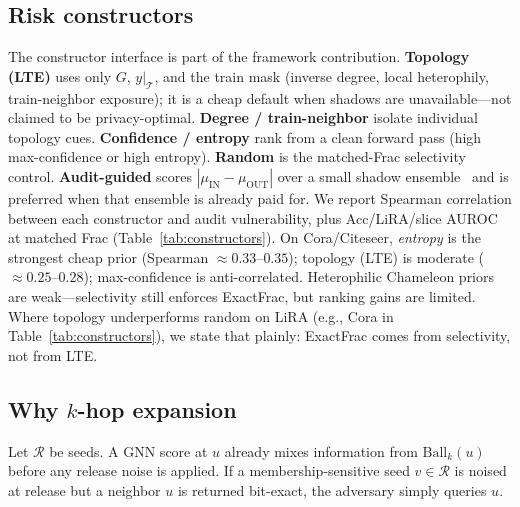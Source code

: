 \documentclass[conference]{IEEEtran}
\begin{document}
\subsection{Risk constructors}
\label{sec:lte}
The constructor interface is part of the framework contribution.
\textbf{Topology (LTE)} uses only $G$, $y|_{\mathcal{T}}$, and the train mask (inverse degree, local heterophily, train-neighbor exposure); it is a cheap default when shadows are unavailable---not claimed to be privacy-optimal.
\textbf{Degree / train-neighbor} isolate individual topology cues.
\textbf{Confidence / entropy} rank from a clean forward pass (high max-confidence or high entropy).
\textbf{Random} is the matched-Frac selectivity control.
\textbf{Audit-guided} scores $|\mu_{\mathrm{IN}}-\mu_{\mathrm{OUT}}|$ over a small shadow ensemble~\cite{aerni2024misleading} and is preferred when that ensemble is already paid for.
We report Spearman correlation between each constructor and audit vulnerability, plus Acc/LiRA/slice AUROC at matched Frac (Table~\ref{tab:constructors}).
On Cora/Citeseer, \emph{entropy} is the strongest cheap prior (Spearman ${\approx}0.33$--$0.35$); topology (LTE) is moderate (${\approx}0.25$--$0.28$); max-confidence is anti-correlated.
Heterophilic Chameleon priors are weak---selectivity still enforces ExactFrac, but ranking gains are limited.
Where topology underperforms random on LiRA (e.g., Cora in Table~\ref{tab:constructors}), we state that plainly: ExactFrac comes from selectivity, not from LTE.

\subsection{Why $k$-hop expansion}
\label{sec:hop}
Let $\mathcal{R}$ be seeds.
A GNN score at $u$ already mixes information from $\mathrm{Ball}_k(u)$ before any release noise is applied.
If a membership-sensitive seed $v\in\mathcal{R}$ is noised at release but a neighbor $u$ is returned bit-exact, the adversary simply queries $u$.
\end{document}
